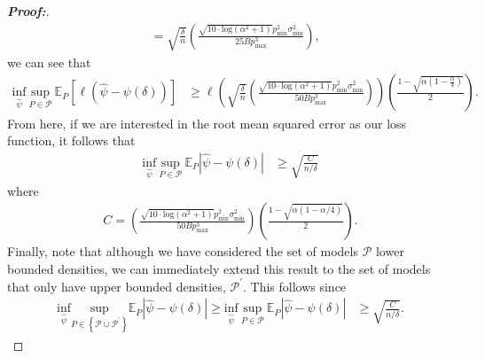 \documentclass[11pt,twoside]{article}
\theoremstyle{definition}
\theoremstyle{remark}
\begin{document}
\begin{proof}[\textbf{Proof:}]
\begin{align*}
    &= \sqrt{\frac{\delta}{n}} \left(\frac{\sqrt{10 \cdot \text{log}(\alpha^2 + 1)}p^2_{\min} \sigma^2_{\min}}{25 B p^3_{\max}} \right),
\end{align*}
we can see that 
\begin{align*}
    \underset{\widehat{\psi}}{\text{inf}} \ \underset{P \in \mathcal{P}}{\text{sup}} \ \mathbb{E}_P \left[\ell\left(\widehat{\psi} - \psi(\delta) \right) \right] &\geq \ell\left(\sqrt{\frac{\delta}{n}} \left(\frac{\sqrt{10 \cdot \text{log}(\alpha^2 + 1)}p^2_{\min} \sigma^2_{\min}}{50 B p^3_{\max}} \right) \right)\left(\frac{1 - \sqrt{\alpha(1 - \frac{\alpha}{4})}}{2} \right).
\end{align*}
From here, if we are interested in the root mean squared error as our loss function, it follows that
\begin{align*}
    \underset{\widehat{\psi}}{\text{inf}} \ \underset{P \in \mathcal{P}}{\text{sup}} \ \mathbb{E}_P \left|\widehat{\psi} - \psi(\delta) \right| &\geq \sqrt{\frac{C}{n/\delta}}
\end{align*}
where
\begin{align*}
    C = \left(\frac{\sqrt{10 \cdot \text{log}(\alpha^2 + 1)}p^2_{\min} \sigma^2_{\min}}{50 B p^3_{\max}} \right)\left(\frac{1 - \sqrt{\alpha(1 - \alpha/4)}}{2} \right).
\end{align*}
Finally, note that although we have considered the set of models $\mathcal{P}$ lower bounded densities, we can immediately extend this result to the set of models that only have upper bounded densities, $\mathcal{P}^\prime$. This follows since
\begin{align*}
    \underset{\widehat{\psi}}{\text{inf}} \underset{P \in \left\{ \mathcal{P} \cup \mathcal{P}^\prime \right\} }{\text{sup}} \mathbb{E}_P \left|\widehat{\psi} - \psi(\delta) \right| \geq \underset{\widehat{\psi}}{\text{inf}} \ \underset{P \in \mathcal{P}}{\text{sup}} \ \mathbb{E}_P \left|\widehat{\psi} - \psi(\delta) \right| &\geq \sqrt{\frac{C}{n/\delta}}.
\end{align*}

\end{proof}
\end{document}
